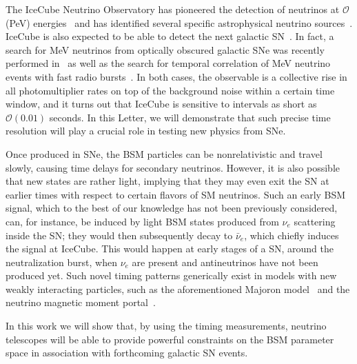 \documentclass[aps,twocolumn,prl,showpacs,showkeys,preprintnumbers,superscriptaddress,nobibnotes,floatfix,longbibliography,notitlepage,nofootinbib]{revtex4-2}
\begin{document}
The IceCube Neutrino Observatory has pioneered the detection of neutrinos at $\mathcal{O}$(PeV) energies~\cite{IceCube:2014stg,IceCube:2018cha} and has identified several specific astrophysical neutrino sources~\cite{IceCube:2018cha,IceCube:2023ame,IceCube:2022der}.
IceCube is also expected to be able to detect the next galactic SN~\cite{Kopke_2011}.
In fact, a search for MeV neutrinos from optically obscured galactic SNe was recently performed in~\cite{IceCube:2023ogt} as well as the search for temporal correlation of MeV neutrino events with fast radio bursts~\cite{IceCube:2019acm}.
In both cases, the observable is a collective rise in all photomultiplier rates on top of the background noise  within a certain time window, and it turns out that IceCube is sensitive to intervals as short as $\mathcal{O}(0.01)$ seconds. 
In this Letter, we will demonstrate that such precise time resolution will play a crucial role in testing new physics from SNe.   

Once produced in SNe, the BSM particles can be nonrelativistic and travel slowly, causing time delays for secondary neutrinos. However, it is also possible that new states are rather light, implying that they may even exit the SN at earlier times with respect to certain flavors of SM neutrinos.
Such an early BSM signal, which to the best of our knowledge has not been previously considered, can, for instance, be induced by light BSM states produced from $\nu_e$ scattering inside the SN; they would then subsequently decay to $\bar{\nu}_e$, which chiefly induces the signal at IceCube. 
This would happen at early stages of a SN, around the neutralization burst, when $\nu_e$ are present and antineutrinos have not been produced yet.
Such novel timing patterns generically exist in models with new weakly interacting particles, such as the aforementioned Majoron model~\cite{Fiorillo:2022cdq} and the neutrino magnetic moment portal~\cite{Magill:2018jla,Brdar:2020quo}.

In this work we will show that, by using the timing measurements, neutrino telescopes will be able to provide powerful constraints on the BSM parameter space in association with forthcoming galactic SN events.\\


\end{document}
